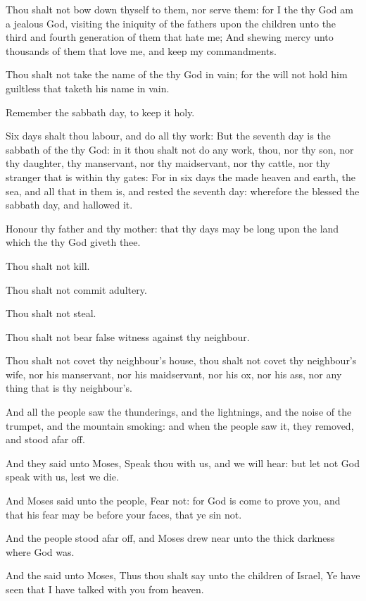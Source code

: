 \Verse Thou shalt not bow down thyself to them, nor serve them: for I the \LORD thy God am a jealous God, visiting the iniquity of the fathers upon the children unto the third and fourth generation of them that hate me; \Verse And shewing mercy unto thousands of them that love me, and keep my commandments.

\Verse Thou shalt not take the name of the \LORD thy God in vain; for the \LORD will not hold him guiltless that taketh his name in vain.

\Verse Remember the sabbath day, to keep it holy.

\Verse Six days shalt thou labour, and do all thy work: \Verse But the seventh day is the sabbath of the \LORD thy God: in it thou shalt not do any work, thou, nor thy son, nor thy daughter, thy manservant, nor thy maidservant, nor thy cattle, nor thy stranger that is within thy gates: \Verse For in six days the \LORD made heaven and earth, the sea, and all that in them is, and rested the seventh day: wherefore the \LORD blessed the sabbath day, and hallowed it.

\Verse Honour thy father and thy mother: that thy days may be long upon the land which the \LORD thy God giveth thee.

\Verse Thou shalt not kill.

\Verse Thou shalt not commit adultery.

\Verse Thou shalt not steal.

\Verse Thou shalt not bear false witness against thy neighbour.

\Verse Thou shalt not covet thy neighbour's house, thou shalt not covet thy neighbour's wife, nor his manservant, nor his maidservant, nor his ox, nor his ass, nor any thing that is thy neighbour's.

\Verse And all the people saw the thunderings, and the lightnings, and the noise of the trumpet, and the mountain smoking: and when the people saw it, they removed, and stood afar off.

\Verse And they said unto Moses, Speak thou with us, and we will hear: but let not God speak with us, lest we die.

\Verse And Moses said unto the people, Fear not: for God is come to prove you, and that his fear may be before your faces, that ye sin not.

\Verse And the people stood afar off, and Moses drew near unto the thick darkness where God was.

\Verse And the \LORD said unto Moses, Thus thou shalt say unto the children of Israel, Ye have seen that I have talked with you from heaven.

